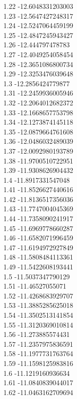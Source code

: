 {1.22	-12.6048331203003\\
1.23	-12.5647427248317\\
1.24	-12.5247064459199\\
1.25	-12.4847245943427\\
1.26	-12.444797478783\\
1.27	-12.4049254058454\\
1.28	-12.3651086800734\\
1.29	-12.3253476039648\\
1.3	-12.2856424779877\\
1.31	-12.2459936005946\\
1.32	-12.2064012682372\\
1.33	-12.1668657753798\\
1.34	-12.1273874145118\\
1.35	-12.0879664761608\\
1.36	-12.0486032489039\\
1.37	-12.0092980193789\\
1.38	-11.9700510722951\\
1.39	-11.9308626904432\\
1.4	-11.8917331547048\\
1.41	-11.8526627440616\\
1.42	-11.8136517356036\\
1.43	-11.7747004045369\\
1.44	-11.7358090241917\\
1.45	-11.6969778660287\\
1.46	-11.6582071996459\\
1.47	-11.6194972927849\\
1.48	-11.5808484113361\\
1.49	-11.5422608193441\\
1.5	-11.5037347790129\\
1.51	-11.46527055071\\
1.52	-11.4268683929707\\
1.53	-11.3885285625018\\
1.54	-11.3502513141854\\
1.55	-11.3120369010814\\
1.56	-11.273885574431\\
1.57	-11.2357975836591\\
1.58	-11.1977731763764\\
1.59	-11.1598125983816\\
1.6	-11.1219160936634\\
1.61	-11.0840839044017\\
1.62	-11.0463162709694\\
}
